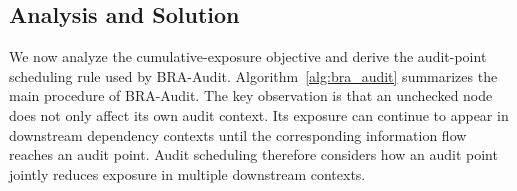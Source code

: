 \documentclass[letterpaper]{article} %
\begin{document}



\subsection{Analysis and Solution}

We now analyze the cumulative-exposure objective and derive the audit-point scheduling rule used by BRA-Audit. Algorithm~\ref{alg:bra_audit} summarizes the main procedure of BRA-Audit. The key observation is that an unchecked node does not only affect its own audit context. Its exposure can continue to appear in downstream dependency contexts until the corresponding information flow reaches an audit point. Audit scheduling therefore considers how an audit point jointly reduces exposure in multiple downstream contexts.
\end{document}
